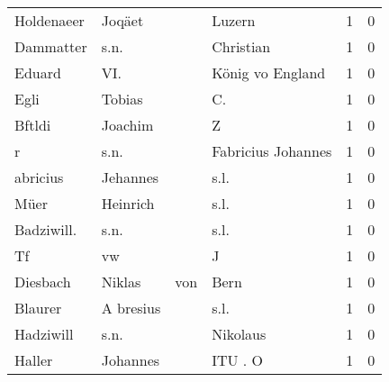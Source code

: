 \begin{center}
\begin{tiny}
\begin{longtabu}{llllrr}
               Holdenaeer &                             Joqäet &             &                                      Luzern &          1 &         0 \\
                Dammatter &                               s.n. &             &                                   Christian &          1 &         0 \\
                   Eduard &                                VI. &             &                            König vo England &          1 &         0 \\
                     Egli &                             Tobias &             &                                         C.  &          1 &         0 \\
                   Bftldi &                            Joachim &             &                                           Z &          1 &         0 \\
                        r &                               s.n. &             &                          Fabricius Johannes &          1 &         0 \\
                 abricius &                           Jehannes &             &                                        s.l. &          1 &         0 \\
                     Müer &                           Heinrich &             &                                        s.l. &          1 &         0 \\
               Badziwill. &                               s.n. &             &                                        s.l. &          1 &         0 \\
                       Tf &                                 vw &             &                                           J &          1 &         0 \\
                 Diesbach &                             Niklas &         von &                                        Bern &          1 &         0 \\
                  Blaurer &                          A bresius &             &                                        s.l. &          1 &         0 \\
                Hadziwill &                               s.n. &             &                                    Nikolaus &          1 &         0 \\
                   Haller &                           Johannes &             &                                     ITU . O &          1 &         0 \\

\end{longtabu}
\end{tiny}
\end{center}
